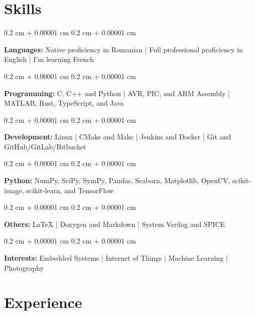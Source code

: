 \documentclass[10pt, a4paper]{article}
\newenvironment{onecolentry}{
    \begin{adjustwidth}{
        0.2 cm + 0.00001 cm
    }{
        0.2 cm + 0.00001 cm
    }
}{
    \end{adjustwidth}
} %
\begin{document}
    
    \section{Skills}



        
        \begin{onecolentry}
            \textbf{Languages:} Native proficiency in Romanian | Full professional proficiency in English | I'm learning French
        \end{onecolentry}

        \vspace{0.2 cm}

        \begin{onecolentry}
            \textbf{Programming:} C, C++ and Python | AVR, PIC, and ARM Assembly | MATLAB, Rust, TypeScript, and Java
        \end{onecolentry}

        \vspace{0.2 cm}

        \begin{onecolentry}
            \textbf{Development:} Linux | CMake and Make | Jenkins and Docker | Git and GitHub/GitLab/Bitbucket
        \end{onecolentry}

        \vspace{0.2 cm}

        \begin{onecolentry}
            \textbf{Python:} NumPy, SciPy, SymPy, Pandas, Seaborn, Matplotlib, OpenCV, scikit-image, scikit-learn, and TensorFlow
        \end{onecolentry}

        \vspace{0.2 cm}

        \begin{onecolentry}
            \textbf{Others:} LaTeX | Doxygen and Markdown | System Verilog and SPICE
        \end{onecolentry}

        \vspace{0.2 cm}

        \begin{onecolentry}
            \textbf{Interests:} Embedded Systems | Internet of Things | Machine Learning | Photography
        \end{onecolentry}


    
    \section{Experience}
\end{document}
